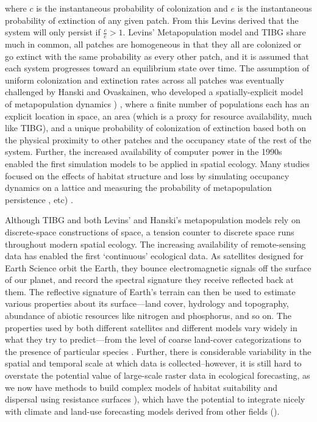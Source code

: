 \documentclass[]{article}
\begin{document}
where \(c\) is the instantaneous probability of colonization and \(e\)
is the instantaneous probability of extinction of any given patch. From
this Levins derived that the system will only persist if
\(\frac{c}{e} > 1\). Levins' Metapopulation model and TIBG share much in
common, all patches are homogeneous in that they all are colonized or go
extinct with the same probability as every other patch, and it is
assumed that each system progresses toward an equilibrium state over
time. The assumption of uniform colonization and extinction rates across
all patches was eventually challenged by Hanski and Ovaskainen, who
developed a spatially-explicit model of metapopulation dynamics
\citep{hanski_practical_1994}) , where a finite number of populations each has
an explicit location in space, an area (which is a proxy for resource
availability, much like TIBG), and a unique probability of colonization
of extinction based both on the physical proximity to other patches and
the occupancy state of the rest of the system. Further, the increased
availability of computer power in the 1990s enabled the first simulation
models to be applied in spatial ecology. Many studies focused on the
effects of habitat structure and loss by simulating occupancy dynamics
on a lattice and measuring the probability of metapopulation persistence
\citep{bascompte_habitat_1996}, etc) .

Although TIBG and both Levins' and Hanski's metapopulation models rely
on discrete-space constructions of space, a tension counter to discrete
space runs throughout modern spatial ecology. The increasing
availability of remote-sensing data has enabled the first `continuous'
ecological data. As satellites designed for Earth Science orbit the
Earth, they bounce electromagnetic signals off the surface of our
planet, and record the spectral signature they receive reflected back at
them. The reflective signature of Earth's terrain can then be used to
estimate various properties about its surface---land cover, hydrology
and topography, abundance of abiotic resources like nitrogen and
phosphorus, and so on. The properties used by both different satellites
and different models vary widely in what they try to predict---from the
level of coarse land-cover categorizations to the presence of particular
species \citep{cite}. Further, there is considerable variability in the spatial and
temporal scale at which data is collected--however, it is still hard to
overstate the potential value of large-scale raster data in ecological
forecasting, as we now have methods to build complex models of habitat
suitability and dispersal using resistance surfaces \citep{cite}),
which have the potential to integrate nicely with climate and land-use
forecasting models derived from other fields (\cite{dietze}).
\end{document}
